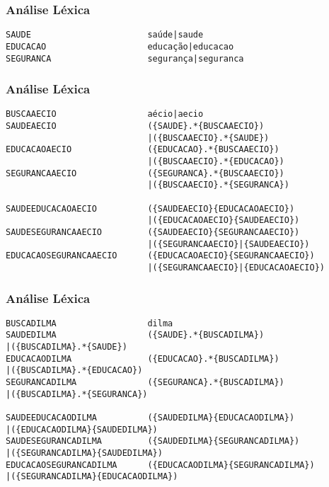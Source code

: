 
\begin{frame}[fragile]
\frametitle{Análise Léxica}
\begin{example}
\begin{verbatim}
SAUDE						saúde|saude
EDUCACAO					educação|educacao
SEGURANCA					segurança|seguranca\end{verbatim}
\end{example}
\end{frame}


\begin{frame}[fragile]
\frametitle{Análise Léxica}
\begin{example}
\begin{verbatim}
BUSCAAECIO 					aécio|aecio
SAUDEAECIO 					({SAUDE}.*{BUSCAAECIO})
							|({BUSCAAECIO}.*{SAUDE})
EDUCACAOAECIO				({EDUCACAO}.*{BUSCAAECIO})
							|({BUSCAAECIO}.*{EDUCACAO})
SEGURANCAAECIO				({SEGURANCA}.*{BUSCAAECIO})
							|({BUSCAAECIO}.*{SEGURANCA})

SAUDEEDUCACAOAECIO			({SAUDEAECIO}{EDUCACAOAECIO})
							|({EDUCACAOAECIO}{SAUDEAECIO})
SAUDESEGURANCAAECIO			({SAUDEAECIO}{SEGURANCAAECIO})
							|({SEGURANCAAECIO}|{SAUDEAECIO})
EDUCACAOSEGURANCAAECIO		({EDUCACAOAECIO}{SEGURANCAAECIO})
							|({SEGURANCAAECIO}|{EDUCACAOAECIO})\end{verbatim}
\end{example}
\end{frame}


\begin{frame}[fragile]
\frametitle{Análise Léxica}
\begin{example}
\begin{verbatim}
BUSCADILMA 					dilma
SAUDEDILMA 					({SAUDE}.*{BUSCADILMA})
|({BUSCADILMA}.*{SAUDE})
EDUCACAODILMA				({EDUCACAO}.*{BUSCADILMA})
|({BUSCADILMA}.*{EDUCACAO})
SEGURANCADILMA				({SEGURANCA}.*{BUSCADILMA})
|({BUSCADILMA}.*{SEGURANCA})

SAUDEEDUCACAODILMA			({SAUDEDILMA}{EDUCACAODILMA})
|({EDUCACAODILMA}{SAUDEDILMA})
SAUDESEGURANCADILMA			({SAUDEDILMA}{SEGURANCADILMA})
|({SEGURANCADILMA}{SAUDEDILMA})
EDUCACAOSEGURANCADILMA		({EDUCACAODILMA}{SEGURANCADILMA})
|({SEGURANCADILMA}{EDUCACAODILMA})\end{verbatim}
\end{example}
\end{frame}

